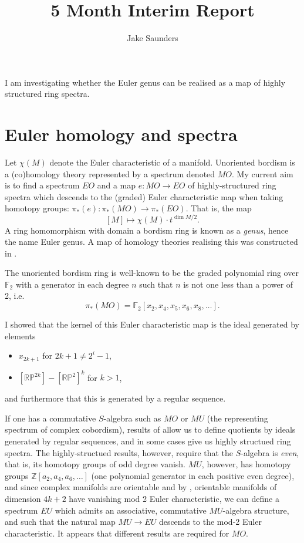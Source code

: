 \documentclass{amsart}
\title{5 Month Interim Report}
\author{Jake Saunders}
\newcommand{\Z}{\mathbb{Z}}
\newcommand{\F}{\mathbb{F}}
\newcommand{\RP}{\mathbb{RP}}
\begin{document}
\maketitle

I am investigating whether the Euler genus can be realised as a map of highly structured ring spectra.

\section{Euler homology and spectra}

Let $\chi(M)$ denote the Euler characteristic of a manifold.
Unoriented bordism is a (co)homology theory represented by a spectrum denoted $MO$.
My current aim is to find a spectrum $EO$ and a map $e : MO \to EO$ of highly-structured ring spectra which descends to the (graded) Euler characteristic map when taking homotopy groups: $\pi_*(e) : \pi_*(MO) \to \pi_*(EO)$.
That is, the map
\[ [M] \mapsto \chi(M) \cdot t^{\dim M/2}. \]
A ring homomorphism with domain a bordism ring is known as a \textit{genus}, hence the name Euler genus.
A map of homology theories realising this was constructed in \cite{weber}.

The unoriented bordism ring is well-known to be the graded polynomial ring over $\F_2$ with a generator in each degree $n$ such that $n$ is not one less than a power of 2, i.e.\
\[ \pi_*(MO) = \F_2[x_2, x_4, x_5, x_6, x_8, \dots]. \]

I showed that the kernel of this Euler characteristic map is the ideal generated by elements
\begin{itemize}
    \item $x_{2k + 1}$ for $2k + 1 \neq 2^i - 1$,
    \item $[\RP^{2k}] - [\RP^2]^k$ for $k > 1$,
\end{itemize}
and furthermore that this is generated by a regular sequence.

If one has a commutative $S$-algebra such as $MO$ or $MU$ (the representing spectrum of complex cobordism), results of \cite{EKMM} allow us to define quotients by ideals generated by regular sequences, and in some cases give us highly structued ring spectra.
The highly-structued results, however, require that the $S$-algebra is \textit{even}, that is, its homotopy groups of odd degree vanish.
$MU$, however, has homotopy groups $\Z[a_2, a_4, a_6, \dots]$ (one polynomial generator in each positive even degree), and since complex manifolds are orientable and by \cite{orientable-mod-2}, orientable manifolds of dimension $4k + 2$ have vanishing mod 2 Euler characteristic, we can define a spectrum $EU$ which admits an associative, commutative $MU$-algebra structure, and such that the natural map $MU \to EU$ descends to the mod-2 Euler characteristic.
It appears that different results are required for $MO$.
\end{document}
